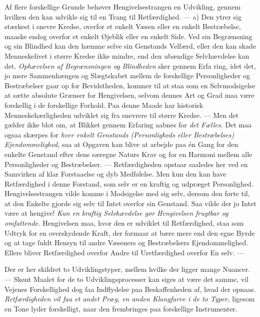 \documentclass[12pt,a4paper,openany]{book}
\newcommand{\opage}[1]{\marginnote{\footnotesize\textit{[#1]}}}
\begin{document}
Af flere forskellige Grunde behøver Hengivelsestrangen en
Udvikling, gennem hvilken den kan udvikle sig til en Trang til
Retfærdighed. --- a) Den ytrer sig stærkest i snevre Kredse,
overfor et enkelt Væsen eller en enkelt Bestræbelse, maaske
endog overfor et enkelt Øjeblik eller en enkelt Side. Ved sin
Begrænsning og sin Blindhed kan den hæmme selve sin Genstands
Velfærd, eller den kan skade Menneskelivet i større
Kredse ikke mindre, end den ubændige Selvhævdelse kan det.
\textit{Ophævelsen af Begrænsningen og Blindheden} sker gennem Erfa%
\setcounter{footnote}{0}%
\opage{59}ring, idet det, jo mere Sammenhængen og Slægtskabet mellem
de forskellige Personligheder og Bestræbelser gaar op for Bevidstheden,
kommer til at staa som en Selvmodsigelse at sætte
absolute Grænser for Hengivelsen, selvom dennes Art og Grad
maa være forskellig i de forskellige Forhold. Paa denne Maade
har historisk Menneskehærligheden udviklet sig fra snevrere til
større Kredse. --- Men det gælder ikke blot om, at Blikket gennem
Erfaring aabnes for \textit{det Fælles.} Det maa ogsaa skærpes for
\textit{hver enkelt Genstands (Personligheds eller Bestræbelses) Ejendommelighed,}
saa at Opgaven kan blive at arbejde paa én Gang for
den enkelte Genstand efter dens særegne Naturs Krav og for
en Harmoni mellem alle Personligheder og Bestræbelser.
--- Retfærdigheden opstaar saaledes her ved en Samvirken af klar
Forstaaelse og dyb Medfølelse. Men kun den kan have Retfærdighed
i denne Forstand, som selv er en kraftig og udpræget
Personlighed. Hengivelsestrangen vilde komme i Modsigelse med
sig selv, dersom den førte til, at den Enkelte gjorde sig selv
til Intet overfor sin Genstand. Saa vilde der jo Intet være at
hengive! \textit{Kun en kraftig Selvhævdelse gør Hengivelsen frugtbar
og omfattende.} Hengivelsen maa, hvor den er udviklet til Retfærdighed,
staa som Udtryk for en overskydende Kraft, der formaar
at bære mere end den egne Byrde og at tage fuldt Hensyn
til andre Væseners og Bestræbelsers Ejendommelighed. Ellers
bliver Retfærdighed overfor Andre til Uretfærdighed overfor En
selv. ---

Der er her skildret to Udviklingstyper, mellem hvilke der
ligger mange Nuancer. --- Skønt Maalet for de to Udviklingsprocesser
kan siges at være det samme, vil Vejenes Forskellighed
dog faa Indflydelse paa Beskaffenheden af, hvad der opnaas.
\textit{Retfærdigheden vil faa et andet Præg, en anden Klangfarve i de
to Typer,} ligesom en Tone lyder forskelligt, naar den frembringes
paa forskellige Instrumenter.
\end{document}
